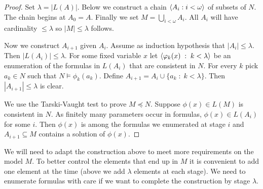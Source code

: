 \begin{proof}
Set $\lambda=|L(A)|$.
Below we construct a chain $\langle A_i:i<\omega\rangle$ of subsets of $N$.
The chain begins at $A_0=A$.
Finally we set $M=\bigcup_{i<\omega}A_i$.
All $A_i$ will have cardinality $\le\lambda$ so  $|M|\le\lambda$ follows.

Now we construct $A_{i+1}$ given $A_i$.
Assume as induction hypothesis that $|A_i|\le\lambda$.
Then $|L(A_i)|\le\lambda$.
For some fixed variable $x$ let $\langle\varphi_k(x)\;:\;k<\lambda\rangle$ be an enumeration of the formulas in $L(A_i)$ that are consistent in $N$.
For every $k$ pick $a_k\in N$ such that $N\models\phi_k(a_k)$.
 Define $A_{i+1}=A_i\cup\{a_k\;:\;k<\lambda\}$.
Then $|A_{i+1}|\le\lambda$ is clear.

We use the Tarski-Vaught test to prove $M\preceq N$.
Suppose $\phi(x)\in L(M)$ is consistent in $N$.
As finitely many parameters occur in formulas, $\phi(x)\in L(A_i)$ for some $i$.
Then $\phi(x)$ is among the formulas we enumerated at stage $i$ and $A_{i+1}\subseteq M$ contains a solution of $\phi(x)$.
\end{proof}

We will need to adapt the construction above to meet more requirements on the model $M$.
To better control the elements that end up in $M$ it is convenient to add one element at the time (above we add $\lambda$ elements at each stage).
We need to enumerate formulas with care if we want to complete the construction by stage $\lambda$.

% 

